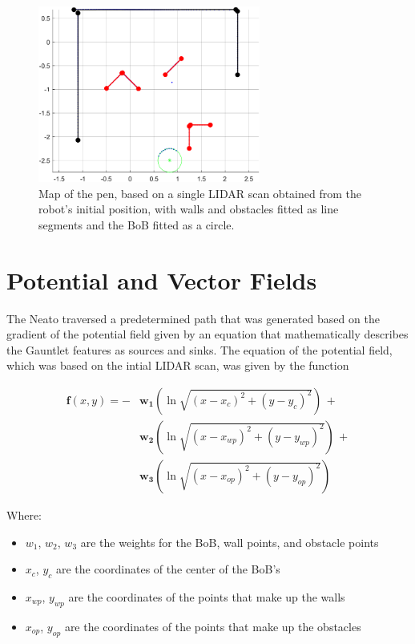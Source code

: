 \begin{figure}[h]
    \centering
    \includegraphics[width=0.65\textwidth]{img/all_shapes.png}
    \caption{Map of the pen, based on a single LIDAR scan obtained from the robot's initial position, with walls and obstacles fitted as line segments and the BoB fitted as a circle.}
    \label{fig:map}
\end{figure}



\section{Potential and Vector Fields}

The Neato traversed a predetermined path that was generated based on the gradient of the potential field given by an equation that mathematically describes the Gauntlet features as sources and sinks. The equation of the potential field, which was based on the intial LIDAR scan, was given by the function

\begin{align*}
    \boldsymbol{f}(x,y) = -&\boldsymbol{w_1}(\ln{\sqrt{(x-x_c)^2+(y-y_c)^2}})\,+ \\
    &\boldsymbol{w_2}(\ln{\sqrt{(x-x_{wp})^2+(y-y_{wp})^2}})\,+ \\
    &\boldsymbol{w_3}(\ln{\sqrt{(x-x_{op})^2+(y-y_{op})^2}})
\end{align*}

\vspace{.1in}

Where:

\begin{itemize}
    \item $w_1$, $w_2$, $w_3$ are the weights for the BoB, wall points, and obstacle points
    \item $x_c$, $y_c$ are the coordinates of the center of the BoB's 
    \item $x_{wp}$, $y_{wp}$ are the coordinates of the points that make up the walls
    \item $x_{op}$, $y_{op}$ are the coordinates of the points that make up the obstacles 
\end{itemize}

